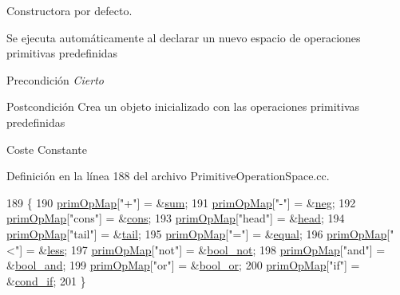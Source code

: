 Constructora por defecto. 

Se ejecuta automáticamente al declarar un nuevo espacio de operaciones primitivas predefinidas \begin{DoxyPrecond}{Precondición}
{\itshape Cierto} 
\end{DoxyPrecond}
\begin{DoxyPostcond}{Postcondición}
Crea un objeto inicializado con las operaciones primitivas predefinidas 
\end{DoxyPostcond}
\begin{DoxyParagraph}{Coste}
Constante 
\end{DoxyParagraph}


Definición en la línea 188 del archivo Primitive\+Operation\+Space.\+cc.


\begin{DoxyCode}
189 \{
190   \hyperlink{class_primitive_operation_space_afd359615001ed1e9b44b9618287834ec}{primOpMap}[\textcolor{stringliteral}{"+"}] = &\hyperlink{class_primitive_operation_space_aa30a58f2003a097535af96ea40b03429}{sum};
191   \hyperlink{class_primitive_operation_space_afd359615001ed1e9b44b9618287834ec}{primOpMap}[\textcolor{stringliteral}{"-"}] = &\hyperlink{class_primitive_operation_space_a2ac4306bae8330f3eb73f5ef8926dfda}{neg};
192   \hyperlink{class_primitive_operation_space_afd359615001ed1e9b44b9618287834ec}{primOpMap}[\textcolor{stringliteral}{"cons"}] = &\hyperlink{class_primitive_operation_space_a4d80dbbbc29a79c286df7c8d7f351111}{cons};
193   \hyperlink{class_primitive_operation_space_afd359615001ed1e9b44b9618287834ec}{primOpMap}[\textcolor{stringliteral}{"head"}] = &\hyperlink{class_primitive_operation_space_a97c2b5092e2465c7deb1aff6ceccc7de}{head};
194   \hyperlink{class_primitive_operation_space_afd359615001ed1e9b44b9618287834ec}{primOpMap}[\textcolor{stringliteral}{"tail"}] = &\hyperlink{class_primitive_operation_space_a08ecc4d0207c93ab245f05732e0024c3}{tail};
195   \hyperlink{class_primitive_operation_space_afd359615001ed1e9b44b9618287834ec}{primOpMap}[\textcolor{stringliteral}{"="}] = &\hyperlink{class_primitive_operation_space_a0a18ec45c82366aea7d1a39ec3b6bb57}{equal};
196   \hyperlink{class_primitive_operation_space_afd359615001ed1e9b44b9618287834ec}{primOpMap}[\textcolor{stringliteral}{"<"}] = &\hyperlink{class_primitive_operation_space_aa5b70cdd115a646d48f686fd49cdedb1}{less};
197   \hyperlink{class_primitive_operation_space_afd359615001ed1e9b44b9618287834ec}{primOpMap}[\textcolor{stringliteral}{"not"}] = &\hyperlink{class_primitive_operation_space_afcb171950067a1a6638b01c916900c78}{bool\_not};
198   \hyperlink{class_primitive_operation_space_afd359615001ed1e9b44b9618287834ec}{primOpMap}[\textcolor{stringliteral}{"and"}] = &\hyperlink{class_primitive_operation_space_a741c40c2ced4d13a87b4ee5c849abdfd}{bool\_and};
199   \hyperlink{class_primitive_operation_space_afd359615001ed1e9b44b9618287834ec}{primOpMap}[\textcolor{stringliteral}{"or"}] = &\hyperlink{class_primitive_operation_space_abb131ec0899228bc3fe2ed54d5c0ebc9}{bool\_or};
200   \hyperlink{class_primitive_operation_space_afd359615001ed1e9b44b9618287834ec}{primOpMap}[\textcolor{stringliteral}{"if"}] = &\hyperlink{class_primitive_operation_space_abbb7fc1afddfa5c5041ac8adfa4a2d55}{cond\_if};
201 \}
\end{DoxyCode}
